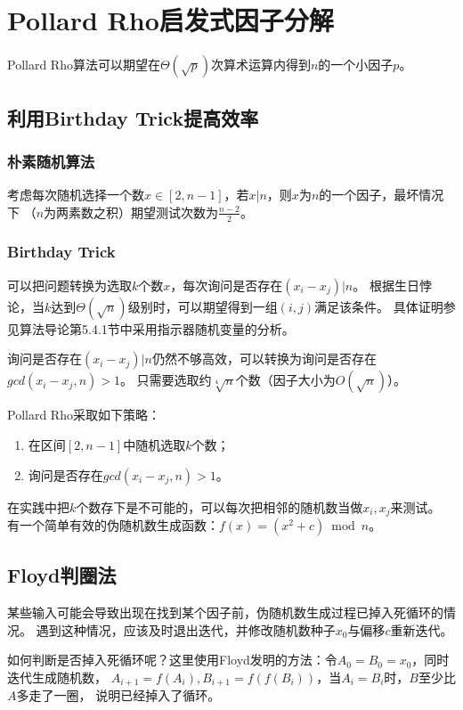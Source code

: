 \section{Pollard Rho启发式因子分解}
Pollard Rho算法可以期望在$\Theta(\sqrt{p})$次算术运算内得到$n$的一个小因子$p$。

\subsection{利用Birthday Trick提高效率}
\subsubsection{朴素随机算法}
考虑每次随机选择一个数$x\in [2,n-1]$，若$x|n$，则$x$为$n$的一个因子，最坏情况下
（$n$为两素数之积）期望测试次数为$\frac{n-2}{2}$。
\subsubsection{Birthday Trick}
可以把问题转换为选取$k$个数$x$，每次询问是否存在$(x_i-x_j)|n$。
根据生日悖论，当$k$达到$\Theta(\sqrt{n})$级别时，可以期望得到一组$(i,j)$满足该条件。
具体证明参见算法导论\cite{ITA3}第5.4.1节中采用指示器随机变量的分析。

询问是否存在$(x_i-x_j)|n$仍然不够高效，可以转换为询问是否存在$gcd(x_i-x_j,n)>1$。
只需要选取约$\sqrt[4]{n}$个数（因子大小为$O(\sqrt{n})$）。


Pollard Rho采取如下策略：
\begin{enumerate}
    \item 在区间$[2,n-1]$中随机选取$k$个数；
    \item 询问是否存在$gcd(x_i-x_j,n)>1$。
\end{enumerate}

在实践中把$k$个数存下是不可能的，可以每次把相邻的随机数当做$x_i,x_j$来测试。
有一个简单有效的伪随机数生成函数：$f(x)=(x^2+c) \bmod n$。

\subsection{Floyd判圈法}
某些输入可能会导致出现在找到某个因子前，伪随机数生成过程已掉入死循环的情况。
遇到这种情况，应该及时退出迭代，并修改随机数种子$x_0$与偏移$c$重新迭代。

如何判断是否掉入死循环呢？这里使用Floyd发明的方法：令$A_0=B_0=x_0$，同时迭代生成随机数，
$A_{i+1}=f(A_i),B_{i+1}=f(f(B_i))$，当$A_i=B_i$时，$B$至少比$A$多走了一圈，
说明已经掉入了循环。

